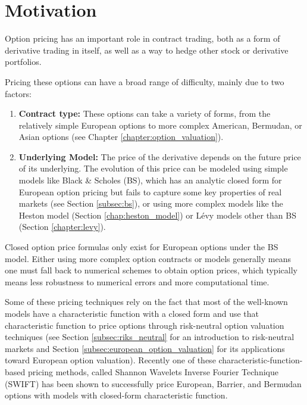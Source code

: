 \documentclass[12,twoside]{mammeTFM}
\theoremstyle{definition}
\theoremstyle{remark}
\begin{document}
\maketitle

\tableofcontents

\pagebreak


\section{Motivation}

Option pricing has an important role in contract trading, both as a form of derivative trading in itself, as well as a way to hedge other stock or derivative portfolios.

Pricing these options can have a broad range of difficulty, mainly due to two factors:
\begin{enumerate}
\item \textbf{Contract type:} These options can take a variety of forms, from the relatively simple European options to more complex American, Bermudan, or Asian options (see Chapter \ref{chapter:option_valuation}).
\item \textbf{Underlying Model: } The price of the derivative depends on the future price of its underlying. The evolution of this price can be modeled using simple models like Black \& Scholes (BS), which has an analytic closed form for European option pricing but fails to capture some key properties of real markets (see Section \ref{subsec:bs}), or using more complex models like the Heston model (Section \ref{chap:heston_model}) or L\'evy models other than BS (Section \ref{chapter:levy}).
\end{enumerate}

Closed option price formulas only exist for European options under the BS model. Either using more complex option contracts or models generally means one must fall back to numerical schemes to obtain option prices, which typically means less robustness to numerical errors and more computational time.

Some of these pricing techniques rely on the fact that most of the well-known models have a characteristic function with a closed form and use that characteristic function to price options through risk-neutral option valuation techniques (see Section \ref{subsec:riks_neutral} for an introduction to risk-neutral markets and Section \ref{subsec:european_option_valuation} for its applications toward European option valuation). Recently one of these characteristic-function-based pricing methods, called Shannon Wavelets Inverse Fourier Technique (SWIFT) \cite{Ortiz-Gracia2016} has been shown to successfully price European, Barrier, and Bermudan options \cite{mar17} with models with closed-form characteristic function.
\end{document}

